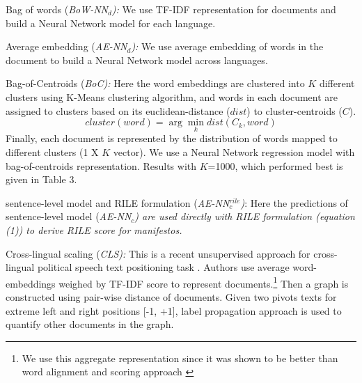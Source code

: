 \documentclass[11pt,a4paper]{article}
\newcommand{\argmin}{\arg\!\min}
\begin{document}
\begin{description}
\item{Bag of words (\em{BoW-NN$_{d}$}):} \rm We use TF-IDF representation for documents and build a Neural Network model  for each language.
\item{Average embedding (\em{AE-NN}$_{d}$):} We use average embedding of words in the document to build a Neural Network model across languages.

\item{Bag-of-Centroids (\em{BoC}):} Here the word embeddings are clustered into $K$ different clusters using K-Means clustering algorithm, and  words in each document are assigned to clusters based on its euclidean-distance ($dist$) to cluster-centroids ($C$). 
\[ cluster (word) = \argmin_k dist(C_{k}, word) \]
Finally, each document is represented by the distribution of words mapped to different clusters (1 X $K$ vector). We use a Neural Network regression model with bag-of-centroids representation. Results with $K$=1000, which performed best is given in Table 3.

\item{sentence-level model and RILE formulation (\em{AE-NN}$_{c}^{rile}$)}: Here the predictions of sentence-level model (\em{AE-NN$_{c}$}) \rm are used directly with RILE formulation (equation (1)) to derive RILE score for manifestos.

\item{Cross-lingual scaling (\em{CLS}):} This is a recent unsupervised approach for cross-lingual political speech text positioning task \cite{EACL}. Authors use average word-embeddings weighed by TF-IDF score to represent documents.\footnote{We use this aggregate representation since it was shown to be better than word alignment and scoring approach \cite{EACL}} Then a graph is constructed using pair-wise distance of documents. Given two pivots texts for extreme left and right positions [-1, +1], label propagation approach is used to quantify other documents in the graph.
\end{description}
\end{document}
